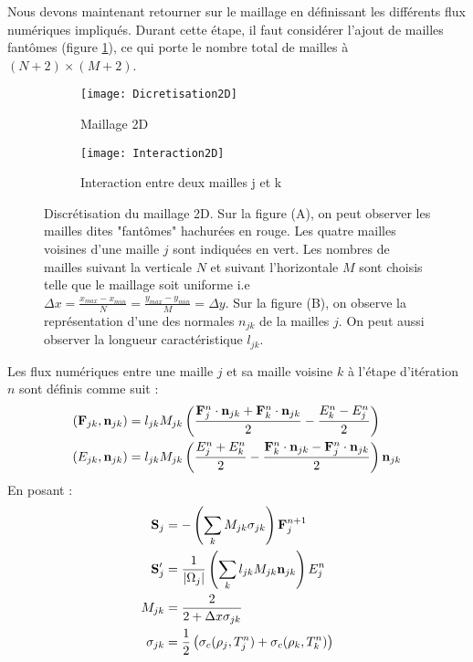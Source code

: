 Nous devons maintenant retourner sur le maillage en définissant les différents flux numériques impliqués. Durant cette étape, il faut considérer l'ajout de mailles fantômes (figure \ref{fig:Discretisation2D}), ce qui porte le nombre total de mailles à $(N+2) \times (M+2)$.

\begin{figure}[H]
\begin{subfigure}{.6\textwidth}
  \centering
  \texttt{[image: Dicretisation2D]}  
  \caption{Maillage 2D}
  \label{fig:Discretisation2D}
\end{subfigure}
\begin{subfigure}{.4\textwidth}
  \centering
  \texttt{[image: Interaction2D]}  
  \caption{Interaction entre deux mailles j et k}
  \label{fig:Interaction2D}
\end{subfigure}

\centering
\decoRule
\caption{Discrétisation du maillage 2D. Sur la figure (A), on peut observer les mailles dites "fantômes" hachurées en rouge. Les quatre mailles voisines d'une maille $j$ sont indiquées en vert. Les nombres de mailles suivant la verticale $N$ et suivant l'horizontale $M$ sont choisis telle que le maillage soit uniforme i.e $\Delta x = \frac{x_{max}-x_{min}}{N} = \frac{y_{max}-y_{min}}{M} = \Delta y$. Sur la figure (B), on observe la représentation d'une des normales $n_{jk}$ de la mailles $j$. On peut aussi observer la longueur caractéristique $l_{jk}.$}
\label{fig:2DMesh}
\end{figure}

Les flux numériques entre une maille $j$ et sa maille voisine $k$ à l'étape d'itération $n$ sont définis comme suit \parencite{Reference4}:
\begin{align*}
 \left(\mathbf{F}_{jk}, \mathbf{n}_{jk} \right) &= l_{jk} M_{jk} \left( \frac{\mathbf{F}_j^n \cdot \mathbf{n}_{jk} + \mathbf{F}_k^n \cdot \mathbf{n}_{jk}}{2} - \frac{E_k^n - E_j^n}{2} \right) \\
 \left( E_{jk}, \mathbf{n}_{jk} \right) &= l_{jk} M_{jk} \left( \frac{E_j^n + E_k^n}{2} - \frac{\mathbf{F}_k^n \cdot \mathbf{n}_{jk} - \mathbf{F}_j^n \cdot \mathbf{n}_{jk}}{2} \right) \mathbf{n}_{jk} \\
\end{align*}
En posant :
\begin{align*}
 \mathbf{S}_j &= - \left( \sum_k M_{jk} \sigma_{jk} \right) \mathbf{F}_{j}^{n+1} \\
 \mathbf{S}_j^{\prime} &= \frac{1}{\left| \Omega_j \right|} \left( \sum_k l_{jk} M_{jk} \mathbf{n}_{jk} \right) E_j^n \\
 M_{jk} &= \frac{2}{2 + \Delta x \sigma_{jk}}  \\
 \sigma_{jk} &= \frac{1}{2} \left( \sigma_c(\rho_j,T_j^n) + \sigma_c(\rho_k,T_k^n) \right)
\end{align*}

